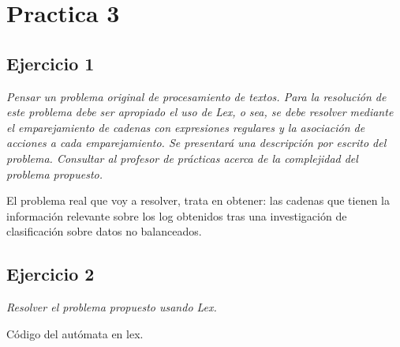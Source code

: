 \newpage

\section{Practica 3}

\subsection{Ejercicio 1}

\textit{Pensar un problema original de procesamiento de textos. Para la resolución de este problema debe ser apropiado el uso de Lex, o sea, se debe resolver mediante el emparejamiento de cadenas con expresiones regulares y la asociación de acciones a cada emparejamiento. Se presentará una descripción por escrito del problema. Consultar al profesor de prácticas acerca de la complejidad del problema propuesto.} \newline

El problema real que voy a resolver, trata en obtener: las cadenas que tienen la información relevante sobre los log obtenidos tras una investigación de clasificación sobre datos no balanceados.

\subsection{Ejercicio 2}

\textit{Resolver el problema propuesto usando Lex.} \newline

Código del autómata en lex. \newline

